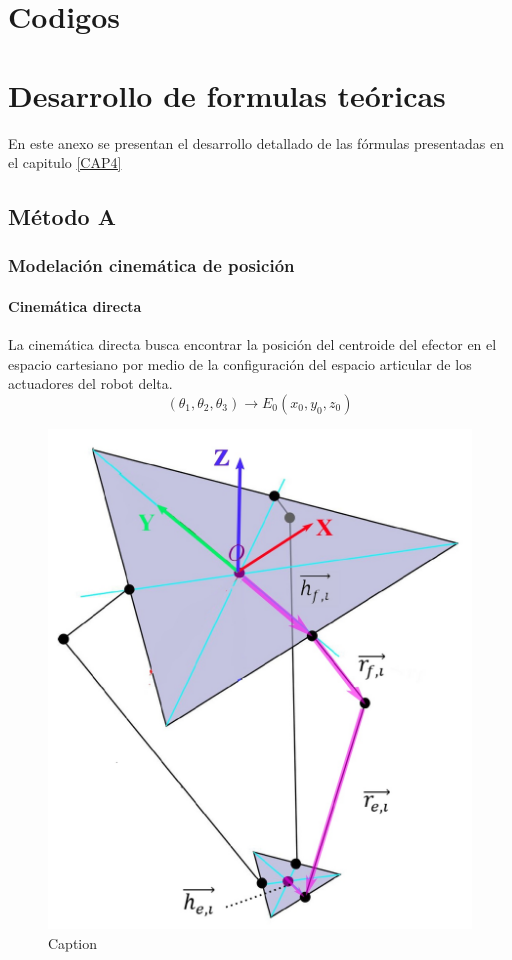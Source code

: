 \chapter{Codigos}\label{anexoA}
\thispagestyle{fancy}
    \section{}
        \subsection{}
        
        
        
\chapter{Desarrollo de formulas teóricas}\label{anexoB}
\thispagestyle{fancy}
    En este anexo se presentan el desarrollo detallado de las fórmulas presentadas en el capitulo \ref{CAP4} 
    
    
\section{Método A}
    \subsection{Modelación cinemática de posición}
        \subsubsection{Cinemática directa}
        
        La cinemática directa busca encontrar la posición del centroide del efector en el espacio cartesiano por medio de la configuración del espacio articular de los actuadores del robot delta.
        \begin{equation*}
             \left(  \theta _{1}, \theta _{2}, \theta _{3} \right)   \rightarrow E_{0} \left( x_{0},y_{0},z_{0} \right)            
        \end{equation*}

        \begin{figure}[htb]
            \centering
            \includegraphics[width=0.45\linewidth]{Main/Chapter4/Images4/DIBUJO10.jpg}
            \caption{Caption}
            \label{fig:ANEXO_MA_C_POS_1}
        \end{figure}

